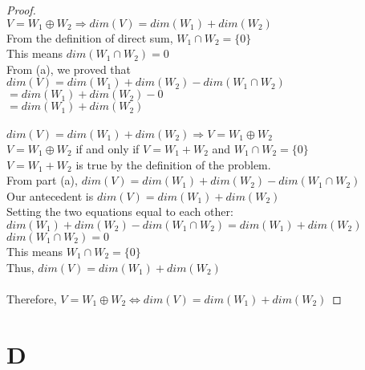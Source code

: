 \documentclass[11pt]{scrartcl}
\begin{document}
\begin{enumerate}[label=\alph*.]
{			\begin{proof}
				\-\\
				$V = W_1 \oplus W_2 \Rightarrow dim(V) = dim(W_1) + dim(W_2)$\\
				From the definition of direct sum, $W_1 \cap W_2 = \{0\}$\\
				This means $dim(W_1 \cap W_2) = 0$\\
				From (a), we proved that $dim(V) = dim(W_1) + dim(W_2) - dim(W_1 \cap W_2)$\\
				$ = dim(W_1) + dim(W_2) - 0$\\
				$ = dim(W_1) + dim(W_2)$\\
				\-\\
				$dim(V) = dim(W_1) + dim(W_2) \Rightarrow V = W_1 \oplus W_2 $\\
				$V = W_1 \oplus W_2$ if and only if $V = W_1 + W_2 $ and $ W_1 \cap W_2 = \{0\}$\\
				$V = W_1 + W_2$ is true by the definition of the problem.\\
				From part (a), $dim(V) = dim(W_1) + dim(W_2) - dim(W_1 \cap W_2)$\\
				Our antecedent is $dim(V) = dim(W_1) + dim(W_2)$\\ 
				Setting the two equations equal to each other:\\
				$dim(W_1) + dim(W_2) - dim(W_1 \cap W_2) = dim(W_1) + dim(W_2)$\\ 
				$dim(W_1 \cap W_2) = 0$\\
				This means $ W_1 \cap W_2 = \{0\}$\\
				Thus, $dim(V) = dim(W_1) + dim(W_2)$ \\
				\-\\
				Therefore, $V = W_1 \oplus W_2 \Leftrightarrow dim(V) = dim(W_1) + dim(W_2)$
			\end{proof}
		}
\end{enumerate}

\section{D}
\end{document}
